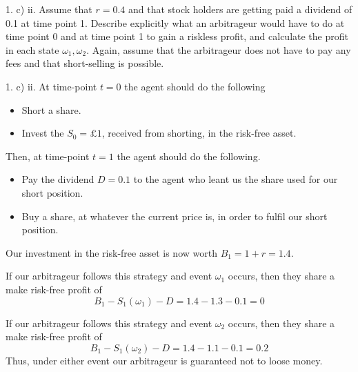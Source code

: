 \documentclass[11pt,a4paper]{article}
\begin{document}
\begin{question}{1. c) ii.}
  Assume that $r=0.4$ and that stock holders are getting paid a dividend of 0.1 at time point 1. Describe explicitly what an arbitrageur would have to do at time point 0 and at time point 1 to gain a riskless profit, and calculate the profit in each state $\omega_1,\omega_2$. Again, assume that the arbitrageur does not have to pay any fees and that short-selling is possible.
\end{question}

\begin{answer}{1. c) ii.}
  At time-point $t=0$ the agent should do the following
  \begin{itemize}
    \item Short a share.
    \item Invest the $S_0=\pounds1$, received from shorting, in the risk-free asset.
  \end{itemize}
  Then, at time-point $t=1$ the agent should do the following.
  \begin{itemize}
    \item Pay the dividend $D=0.1$ to the agent who leant us the share used for our short position.
    \item Buy a share, at whatever the current price is, in order to fulfil our short position.
  \end{itemize}
  Our investment in the risk-free asset is now worth $B_1=1+r=1.4$.
  \par If our arbitrageur follows this strategy and event $\omega_1$ occurs, then they share a make risk-free profit of
  \[ B_1-S_1(\omega_1)-D=1.4-1.3-0.1=0 \]
  \par If our arbitrageur follows this strategy and event $\omega_2$ occurs, then they share a make risk-free profit of
  \[ B_1-S_1(\omega_2)-D=1.4-1.1-0.1=0.2 \]
  Thus, under either event our arbitrageur is guaranteed not to loose money.
\end{answer}
\end{document}
